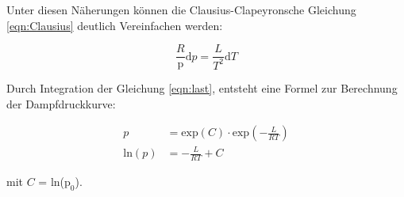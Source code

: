 \noindent Unter diesen Näherungen können die Clausius-Clapeyronsche Gleichung \eqref{eqn:Clausius} deutlich Vereinfachen werden:

\begin{equation}
    \frac{R}{\text{p}}\text{d}p = \frac{L}{T^2}\text{d}T
    \label{eqn:last}
\end{equation}

\noindent Durch Integration der Gleichung \eqref{eqn:last}, entsteht eine Formel zur Berechnung der Dampfdruckkurve:

\begin{align}
p &= \text{exp}(C)\cdot \text{exp}\left(-\frac{L}{RT}\right) \nonumber\\
\text{ln}(p)&= -\frac{L}{RT} + C \label{eqn:steigung}
\end{align}

\noindent mit $C$ = ln($\text{p}_0$).
